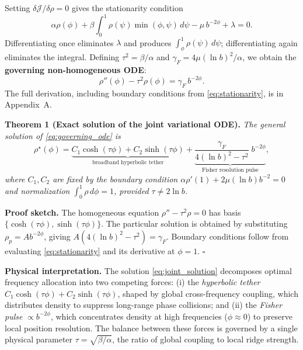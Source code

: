 \documentclass{article}
\begin{document}
Setting $\delta\mathcal{J}/\delta\rho=0$ gives the stationarity condition
\begin{equation}
\alpha\rho(\phi)+\beta\!\int_0^1\!\rho(\psi)\min(\phi,\psi)\,d\psi - \mu\,b^{-2\phi}+\lambda=0.
\label{eq:stationarity}
\end{equation}
Differentiating once eliminates $\lambda$ and produces $\int_\phi^1\rho(\psi)\,d\psi$; differentiating again eliminates the integral. Defining $\tau^2=\beta/\alpha$ and $\gamma_F=4\mu(\ln b)^2/\alpha$, we obtain the \textbf{governing non-homogeneous ODE}:
\begin{equation}
\rho''(\phi)-\tau^2\rho(\phi)=\gamma_F\,b^{-2\phi}.
\label{eq:governing_ode}
\end{equation}
The full derivation, including boundary conditions from \eqref{eq:stationarity}, is in Appendix~A.

\textbf{Theorem 1 (Exact solution of the joint variational ODE).}
\textit{The general solution of \eqref{eq:governing_ode} is}
\begin{equation}
\rho^{\star}(\phi) = \underbrace{C_1\cosh(\tau\phi)+C_2\sinh(\tau\phi)}_{\text{broadband hyperbolic tether}} + \underbrace{\frac{\gamma_F}{4(\ln b)^2-\tau^2}\;b^{-2\phi}}_{\text{Fisher resolution pulse}},
\label{eq:joint_solution}
\end{equation}
\textit{where $C_1,C_2$ are fixed by the boundary condition $\alpha\rho'(1)+2\mu(\ln b)b^{-2}=0$ and normalization $\int_0^1\rho\,d\phi=1$, provided $\tau\neq 2\ln b$.}

\textbf{Proof sketch.} The homogeneous equation $\rho''-\tau^2\rho=0$ has basis $\{\cosh(\tau\phi),\sinh(\tau\phi)\}$. The particular solution is obtained by substituting $\rho_p=Ab^{-2\phi}$, giving $A(4(\ln b)^2-\tau^2)=\gamma_F$. Boundary conditions follow from evaluating \eqref{eq:stationarity} and its derivative at $\phi=1$. \hfill$\square$

\textbf{Physical interpretation.} The solution \eqref{eq:joint_solution} decomposes optimal frequency allocation into two competing forces: (i) the \emph{hyperbolic tether} $C_1\cosh(\tau\phi)+C_2\sinh(\tau\phi)$, shaped by global cross-frequency coupling, which distributes density to suppress long-range phase collisions; and (ii) the \emph{Fisher pulse} $\propto b^{-2\phi}$, which concentrates density at high frequencies ($\phi\approx 0$) to preserve local position resolution. The balance between these forces is governed by a single physical parameter $\tau=\sqrt{\beta/\alpha}$, the ratio of global coupling to local ridge strength.
\end{document}
